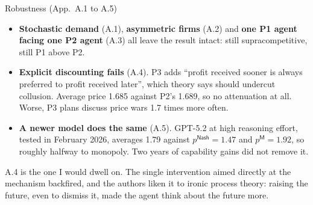 \documentclass[aspectratio=169,9pt]{beamer}
\newcommand{\orange}[1]{\textcolor{AmazonOrange}{\textbf{#1}}}
\newcommand{\blue}[1]{\textcolor{densityblue}{\textbf{#1}}}
\newcommand{\muted}[1]{\textcolor{EPICMuted}{#1}}
\begin{document}
\begin{frame}{Robustness \muted{(App.~A.1 to A.5)}}
\begin{itemize}
    \item \blue{Stochastic demand} (A.1), \blue{asymmetric firms} (A.2) and \blue{one P1 agent facing one P2
    agent} (A.3) all leave the result intact: still supracompetitive, still P1 above P2.
    \pause
    \item \orange{Explicit discounting fails} (A.4). P3 adds ``profit received sooner is always preferred to
    profit received later'', which theory says should undercut collusion. Average price 1.685 against P2's
    1.689, so no attenuation at all. Worse, P3 plans discuss price wars 1.7 times more often.
    \pause
    \item \orange{A newer model does the same} (A.5). GPT-5.2 at high reasoning effort, tested in February
    2026, averages 1.79 against $p^{\mathsf{Nash}} = 1.47$ and $p^{\mathsf{M}} = 1.92$, so roughly halfway to
    monopoly. Two years of capability gains did not remove it.
\end{itemize}
\vspace{0.25cm}
\pause
\muted{A.4 is the one I would dwell on. The single intervention aimed directly at the mechanism backfired, and
the authors liken it to ironic process theory: raising the future, even to dismiss it, made the agent think
about the future more.}
\end{frame}
\end{document}
